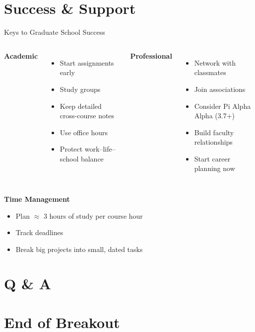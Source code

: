\documentclass[10pt]{beamer}
\begin{document}
\section{\textcolor{titanorange}{Success \& Support}}
\begin{frame}{Keys to Graduate School Success}
\begin{columns}[T,onlytextwidth]
  \textbf{Academic}
  \begin{itemize}
    \item Start assignments early
    \item Study groups
    \item Keep detailed cross-course notes
    \item Use office hours
    \item Protect work--life--school balance
  \end{itemize}
  \textbf{Professional}
  \begin{itemize}
    \item Network with classmates
    \item Join associations
    \item Consider Pi Alpha Alpha (3.7+)
    \item Build faculty relationships
    \item Start career planning now
  \end{itemize}
\end{columns}

\vspace{0.4em}
\textbf{Time Management}
\begin{itemize}
  \item Plan \(\approx\) 3 hours of study per course hour
  \item Track deadlines
  \item Break big projects into small, dated tasks
\end{itemize}
\end{frame}

\section{\textcolor{titanorange}{Q \& A}}

\section{\textcolor{titanorange}{End of Breakout}}
\end{document}

